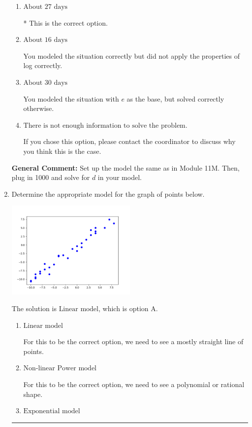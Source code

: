 \documentclass{extbook}[14pt]
\newcommand{\litem}[1]{\item #1

\rule{\textwidth}{0.4pt}}
\begin{document}
\begin{enumerate}
{\begin{enumerate}[label=\Alph*.]
You modeled the situation with $e$ as the base and did not apply the properties of log correctly.
\item \( \text{About } 27 \text{ days} \)

* This is the correct option.
\item \( \text{About } 16 \text{ days} \)

You modeled the situation correctly but did not apply the properties of log correctly.
\item \( \text{About } 30 \text{ days} \)

You modeled the situation with $e$ as the base, but solved correctly otherwise.
\item \( \text{There is not enough information to solve the problem.} \)

If you chose this option, please contact the coordinator to discuss why you think this is the case.
\end{enumerate}

\textbf{General Comment:} Set up the model the same as in Module 11M. Then, plug in 1000 and solve for $d$ in your model.
}
\litem{
Determine the appropriate model for the graph of points below.

\begin{center}
    \includegraphics[width=0.5\textwidth]{../Figures/identifyModelGraph12B.png}
\end{center}


The solution is \( \text{Linear model} \), which is option A.\begin{enumerate}[label=\Alph*.]
\item \( \text{Linear model} \)

For this to be the correct option, we need to see a mostly straight line of points.
\item \( \text{Non-linear Power model} \)

For this to be the correct option, we need to see a polynomial or rational shape.
\item \( \text{Exponential model} \)


\end{enumerate}}
\end{enumerate}
\end{document}
